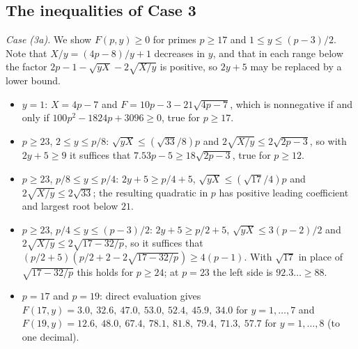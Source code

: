 \documentclass[11pt]{article}
\theoremstyle{remark}
\begin{document}
\begin{appendices}
\section{The inequalities of Case 3}\label{app:ineq}

\emph{Case (3a).} We show $F(p,y)\ge0$ for primes $p\ge17$ and $1\le y\le(p-3)/2$. Note that $X/y=(4p-8)/y+1$ decreases in $y$, and that in each range below the factor $2p-1-\sqrt{yX}-2\sqrt{X/y}$ is positive, so $2y+5$ may be replaced by a lower bound.
\begin{itemize}
\item $y=1$: $X=4p-7$ and $F=10p-3-21\sqrt{4p-7}$, which is nonnegative if and only if $100p^2-1824p+3096\ge0$, true for $p\ge17$.
\item $p\ge23$, $2\le y\le p/8$: $\sqrt{yX}\le(\sqrt{33}/8)p$ and $2\sqrt{X/y}\le2\sqrt{2p-3}$, so with $2y+5\ge9$ it suffices that $7.53p-5\ge18\sqrt{2p-3}$, true for $p\ge12$.
\item $p\ge23$, $p/8\le y\le p/4$: $2y+5\ge p/4+5$, $\sqrt{yX}\le(\sqrt{17}/4)p$ and $2\sqrt{X/y}\le2\sqrt{33}$; the resulting quadratic in $p$ has positive leading coefficient and largest root below $21$.
\item $p\ge23$, $p/4\le y\le(p-3)/2$: $2y+5\ge p/2+5$, $\sqrt{yX}\le3(p-2)/2$ and $2\sqrt{X/y}\le2\sqrt{17-32/p}$, so it suffices that $(p/2+5)(p/2+2-2\sqrt{17-32/p})\ge4(p-1)$. With $\sqrt{17}$ in place of $\sqrt{17-32/p}$ this holds for $p\ge24$; at $p=23$ the left side is $92.3\ldots\ge88$.
\item $p=17$ and $p=19$: direct evaluation gives $F(17,y)=3.0,\ 32.6,\ 47.0,\ 53.0,\ 52.4,\ 45.9,\ 34.0$ for $y=1,\dots,7$ and $F(19,y)=12.6,\ 48.0,\ 67.4,\ 78.1,\ 81.8,\ 79.4,\ 71.3,\ 57.7$ for $y=1,\dots,8$ (to one decimal).
\end{itemize}


\end{appendices}
\end{document}
